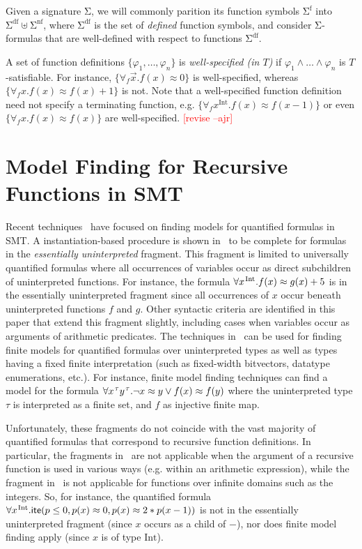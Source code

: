 \documentclass[runningheads,a4paper]{llncs}
\newcommand{\con}[1]{\mathsf{#1}}
\let\oldSigma=\Sigma
\def\Sigma{\mathrm{\oldSigma}}
\newcommand{\teq}{\approx}
\newcommand{\sfuns}[1]{#1^\mathrm{f}}
\newcommand{\sfundefs}[1]{#1^\mathrm{df}}
\newcommand{\sfunndefs}[1]{#1^\mathrm{nf}}
\newcommand{\sortint}{\mathrm{Int}}
\newcommand{\lite}{\con{ite}}
\newcommand{\forallf}[1]{\forall_{#1}}
\newcommand{\rem}[1]{\textcolor{red}{[#1]}}
\newcommand{\ajr}[1]{\rem{#1 --ajr}}
\newcommand{\vthinspace}{\kern+0.083333em}
\newcommand{\typ}[1]{^{\vthinspace #1}}
\begin{document}
Given a signature $\Sigma$, 
we will commonly parition its function symbols $\sfuns{\Sigma}$ into $\sfundefs{\Sigma} \mathrel{\uplus} \sfunndefs{\Sigma}$,
where $\sfundefs{\Sigma}$ is the set of \emph{defined} function symbols,
and consider $\Sigma$-formulas that are well-defined with respect to functions $\sfundefs{\Sigma}$.

A set of function definitions $\{ \varphi_1, \ldots, \varphi_n \}$ 
is \emph{well-specified (in $T$)} if $\varphi_1 \wedge \ldots \wedge \varphi_n$ is $T$-satisfiable.
For instance, $\{ \forallf{f} \vec x. f( x ) \teq 0 \}$ is well-specified,
whereas $\{ \forallf{f} x. f( x ) \teq f( x ) + 1 \}$ is not. 
Note that a well-specified function definition need not specify a terminating function, e.g.
$\{ \forallf{f} x^\sortint. f( x ) \teq f( x - 1 ) \}$ or even $\{ \forallf{f} x. f( x ) \teq f( x ) \}$ are well-specified.
\ajr{revise}

\section{Model Finding for Recursive Functions in SMT}
\label{sec:model-finding-rec-fun}

Recent techniques~\cite{GeDeM-CAV-09, ReyEtAl-1-RR-13} 
have focused on finding models for quantified formulas in SMT.
A instantiation-based procedure is shown in~\cite{GeDeM-CAV-09} to be complete for formulas in the \emph{essentially uninterpreted} fragment.
This fragment is limited to universally quantified formulas where all occurrences of variables occur as direct subchildren of uninterpreted functions.
For instance, the formula $\forall x\typ{\sortint}. f( x ) \teq g( x ) + 5$ 
is in the essentially uninterpreted fragment since all occurrences of $x$ occur beneath uninterpreted functions $f$ and $g$.
Other syntactic criteria are identified in this paper that extend this fragment slightly, including cases when variables occur as arguments of arithmetic predicates.
The techniques in~\cite{ReyEtAl-1-RR-13} can be used for finding finite models for quantified formulas over uninterpreted types as well as types having a 
fixed finite interpretation (such as fixed-width bitvectors, datatype enumerations, etc.).
For instance, 
finite model finding techniques can find a model for
the formula $\forall x\typ{\tau} y\typ{\tau}. \neg x \teq y \vee f( x ) \teq f( y )$
where the uninterpreted type $\tau$ is interpreted as a finite set, and $f$ as injective finite map.

Unfortunately, these fragments do not coincide with the vast majority of quantified formulas that correspond to recursive function definitions.
In particular, the fragments in~\cite{GeDeM-CAV-09} are not applicable when the argument of a recursive function is used in various ways (e.g. within an arithmetic expression), 
while the fragment in~\cite{ReyEtAl-1-RR-13} is not applicable for functions over infinite domains such as the integers.
So, for instance, the quantified formula $\forall x\typ{\sortint}. \lite( p \leq 0, p( x ) \teq 0, p( x ) \teq 2 * p( x - 1 ) )$ 
is not in the essentially uninterpreted fragment (since $x$ occurs as a child of $-$),
nor does finite model finding apply (since $x$ is of type $\sortint$).
\end{document}
